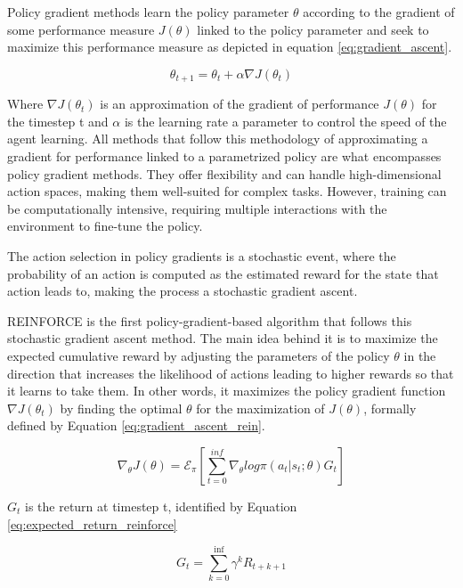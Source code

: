 Policy gradient methods learn the policy parameter $\theta$ according to the gradient of some performance measure $J(\theta)$ linked to the policy parameter and seek to maximize this performance measure as depicted in equation \ref{eq:gradient_ascent}.

\begin{equation}
    \label{eq:gradient_ascent}
    \theta_{t+1} = \theta_t + \alpha \nabla J (\theta_t)
\end{equation}

Where $\nabla J (\theta_t)$ is an approximation of the gradient of performance $J(\theta)$ for the timestep t and $\alpha$ is the learning rate a parameter to control the speed of the agent learning. All methods that follow this methodology of approximating a gradient for performance linked to a parametrized policy are what encompasses policy gradient methods. They offer flexibility and can handle high-dimensional action spaces, making them well-suited for complex tasks. However, training can be computationally intensive, requiring multiple interactions with the environment to fine-tune the policy.

The action selection in policy gradients is a stochastic event, where the probability of an action is computed as the estimated reward for the state that action leads to, making the process a stochastic gradient ascent.

REINFORCE \cite{sutton1999policy} is the first policy-gradient-based algorithm that follows this stochastic gradient ascent method. The main idea behind it is to maximize the expected cumulative reward by adjusting the parameters of the policy $\theta$ in the direction that increases the likelihood of actions leading to higher rewards so that it learns to take them. In other words, it maximizes the policy gradient function $\nabla J (\theta_t)$ by finding the optimal $\theta$ for the maximization of $J(\theta)$, formally defined by Equation \ref{eq:gradient_ascent_rein}.

\begin{equation}
    \label{eq:gradient_ascent_rein}
    \nabla_\theta J(\theta) = \mathcal{E}_\pi[\sum_{t=0}^{inf}\nabla_\theta log \pi(a_t|s_t;\theta)G_t]
\end{equation}

$G_t$ is the return at timestep t, identified by Equation \ref{eq:expected_return_reinforce}

\begin{equation}
    \label{eq:expected_return_reinforce}
    G_t = \sum_{k=0}^{\inf} \gamma^k R_{t+k+1}
\end{equation}

